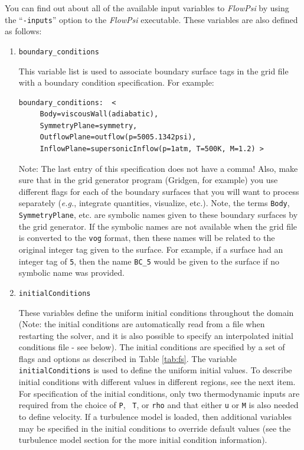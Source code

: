\documentclass{article}
\begin{document}
You can find out about all of the available input variables to {\em FlowPsi}
by using the ``{\tt -inputs}'' option to the {\em FlowPsi} executable.
These variables are also defined as follows:


\begin{enumerate}
 
\item {\tt boundary\_conditions}

This variable list is used to associate boundary surface tags in 
the grid file with a boundary condition specification.  For example:
\begin{verbatim}
boundary_conditions:  <
     Body=viscousWall(adiabatic),
     SymmetryPlane=symmetry,
     OutflowPlane=outflow(p=5005.1342psi),
     InflowPlane=supersonicInflow(p=1atm, T=500K, M=1.2) >
\end{verbatim}
Note: The last entry of this specification does not have a comma!
Also, make sure that in the grid generator program (Gridgen, for
example) you use different flags for each of the boundary surfaces
that you will want to process separately ({\it e.g.}, integrate
quantities, visualize, etc.).  Note, the terms {\tt Body}, {\tt
  SymmetryPlane}, etc.  are symbolic names given to these boundary
surfaces by the grid generator.  If the symbolic names are not
available when the grid file is converted to the {\tt vog} format,
then these names will be related to the original integer tag given to
the surface.  For example, if a surface had an integer tag of {\tt 5},
then the name {\tt BC\_5} would be given to the surface if no symbolic
name was provided.

\item {\tt initialConditions} 

  These variables define the uniform initial conditions throughout the
  domain (Note: the initial conditions are automatically read from a
  file when restarting the solver, and it is also possible to specify
  an interpolated initial conditions file - see below).  The initial
  conditions are specified by a set of flags and options as described
  in Table \ref{tab:fs}.  The variable {\tt initialConditions} is used
  to define the uniform initial values.  To describe initial
  conditions with different values in different regions, see the next
  item.  For specification of the initial conditions, only two
  thermodynamic inputs are required from the choice of {\tt P}, {\tt
    T}, or {\tt rho} and that either {\tt u} or {\tt M} is also needed
  to define velocity.  If a turbulence model is loaded, then
  additional variables may be specified in the initial conditions to
  override default values (see the turbulence model section for the
  more initial condition information).


\end{enumerate}
\end{document}
